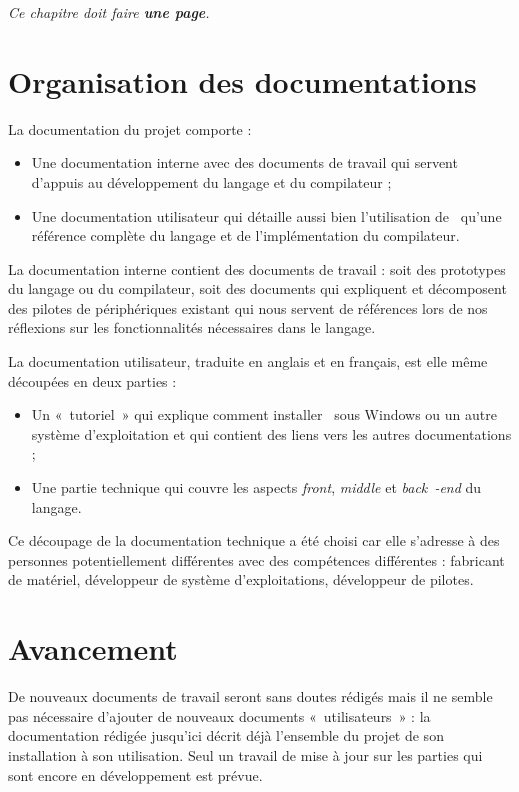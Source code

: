 \documentclass[francais]{rtxreport}
\begin{document}
\emph{Ce chapitre doit faire \textbf{une page}.}

\section{Organisation des documentations}

La documentation du projet comporte :
\begin{itemize}
\item Une documentation interne avec des documents de travail qui servent
d'appuis au développement du langage et du compilateur ;
\item Une documentation utilisateur qui détaille aussi bien l'utilisation de
\rtx\ qu'une référence complète du langage et de l'implémentation du
compilateur.
\end{itemize}

La documentation interne contient des documents de travail : soit des prototypes
du langage ou du compilateur, soit des documents qui expliquent et décomposent
des pilotes de périphériques existant qui nous servent de références lors de nos
réflexions sur les fonctionnalités nécessaires dans le langage.

La documentation utilisateur, traduite en anglais et en français, est elle même
découpées en deux parties :
\begin{itemize}
\item Un «~tutoriel~» qui explique comment installer \rtx\ sous Windows ou un
autre système d'exploitation et qui contient des liens vers les autres
documentations ;
\item Une partie technique qui couvre les aspects \emph{front}, \emph{middle} et
\emph{back~-end} du langage.
\end{itemize}
Ce découpage de la documentation technique a été choisi car elle s'adresse à des
personnes potentiellement différentes avec des compétences différentes :
fabricant de matériel, développeur de système d'exploitations, développeur de
pilotes.

\section{Avancement}

De nouveaux documents de travail seront sans doutes rédigés mais il ne semble
pas nécessaire d'ajouter de nouveaux documents «~utilisateurs~» : la
documentation rédigée jusqu'ici décrit déjà l'ensemble du projet de
son installation à son utilisation. Seul un travail de mise à jour sur les
parties qui sont encore en développement est prévue.
\end{document}
